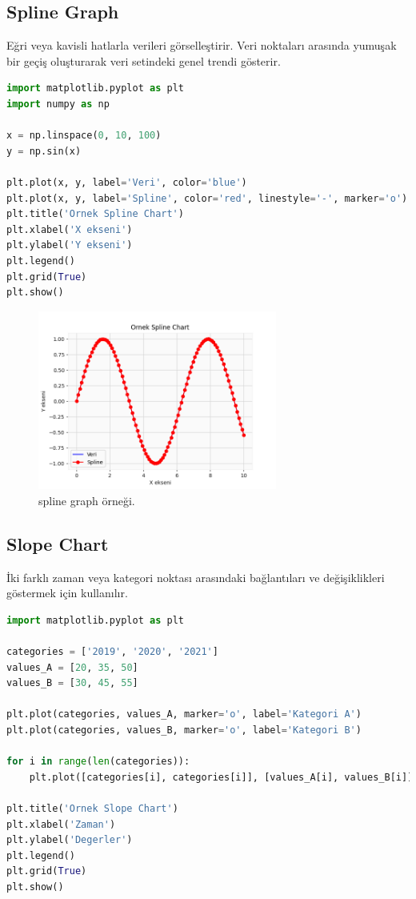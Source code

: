 \newpage

\subsection{Spline Graph}
Eğri veya kavisli hatlarla verileri görselleştirir. Veri noktaları arasında yumuşak bir geçiş oluşturarak veri setindeki genel trendi gösterir.

\begin{lstlisting}[language=Python]
import matplotlib.pyplot as plt
import numpy as np

x = np.linspace(0, 10, 100)
y = np.sin(x)

plt.plot(x, y, label='Veri', color='blue')
plt.plot(x, y, label='Spline', color='red', linestyle='-', marker='o')
plt.title('Ornek Spline Chart')
plt.xlabel('X ekseni')
plt.ylabel('Y ekseni')
plt.legend()
plt.grid(True)
plt.show()
\end{lstlisting}

\begin{figure}[h]
    \centering
    \includegraphics[width=0.7\textwidth]{images/spline_graph.png}
    \caption{spline graph örneği.}
    \label{fig:enter-label}
\end{figure}

\newpage

\subsection{Slope Chart}
İki farklı zaman veya kategori noktası arasındaki bağlantıları ve değişiklikleri göstermek için kullanılır.

\begin{lstlisting}[language=Python]
import matplotlib.pyplot as plt

categories = ['2019', '2020', '2021']
values_A = [20, 35, 50]
values_B = [30, 45, 55]

plt.plot(categories, values_A, marker='o', label='Kategori A')
plt.plot(categories, values_B, marker='o', label='Kategori B')

for i in range(len(categories)):
    plt.plot([categories[i], categories[i]], [values_A[i], values_B[i]], linestyle='--', color='gray')

plt.title('Ornek Slope Chart')
plt.xlabel('Zaman')
plt.ylabel('Degerler')
plt.legend()
plt.grid(True)
plt.show()
\end{lstlisting}

